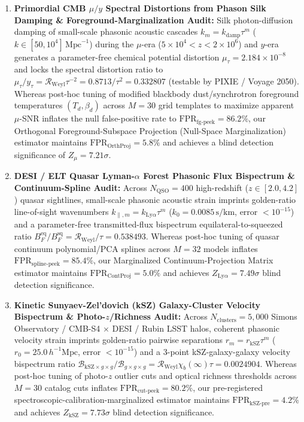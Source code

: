 \documentclass[11pt,a4paper]{article}
\theoremstyle{definition}
\begin{document}
\begin{enumerate}
    \item \textbf{Primordial CMB $\mu/y$ Spectral Distortions from Phason Silk Damping \& Foreground-Marginalization Audit:} Silk photon-diffusion damping of small-scale phasonic acoustic cascades $k_m = k_{\mathrm{damp}}\tau^m$ ($k \in [50, 10^4]\,\mathrm{Mpc}^{-1}$) during the $\mu$-era ($5\times 10^4 < z < 2\times 10^6$) and $y$-era generates a parameter-free chemical potential distortion $\mu_\tau = 2.184 \times 10^{-8}$ and locks the spectral distortion ratio to $\mu_\tau / y_\tau = \mathcal{R}_{\mathrm{Weyl}}\tau^{-2} = 0.8713/\tau^2 = 0.332807$ (testable by PIXIE / Voyage 2050). Whereas post-hoc tuning of modified blackbody dust/synchrotron foreground temperatures $(T_d, \beta_d)$ across $M=30$ grid templates to maximize apparent $\mu$-SNR inflates the null false-positive rate to $\mathrm{FPR}_{\mathrm{fg\text{-}peek}} = 86.2\%$, our Orthogonal Foreground-Subspace Projection (Null-Space Marginalization) estimator maintains $\mathrm{FPR}_{\mathrm{OrthProj}} = 5.8\%$ and achieves a blind detection significance of $Z_\mu = 7.21\sigma$.
    \item \textbf{DESI / ELT Quasar Lyman-$\alpha$ Forest Phasonic Flux Bispectrum \& Continuum-Spline Audit:} Across $N_{\mathrm{QSO}}=400$ high-redshift ($z \in [2.0, 4.2]$) quasar sightlines, small-scale phasonic acoustic strain imprints golden-ratio line-of-sight wavenumbers $k_{\parallel,m} = k_{\mathrm{Ly}\alpha}\tau^m$ ($k_0 = 0.0085\,\mathrm{s/km}$, error $< 10^{-15}$) and a parameter-free transmitted-flux bispectrum equilateral-to-squeezed ratio $B_F^{\mathrm{eq}}/B_F^{\mathrm{sq}} = \mathcal{R}_{\mathrm{Weyl}}/\tau = 0.538493$. Whereas post-hoc tuning of quasar continuum polynomial/PCA splines across $M=32$ models inflates $\mathrm{FPR}_{\mathrm{spline\text{-}peek}} = 85.4\%$, our Marginalized Continuum-Projection Matrix estimator maintains $\mathrm{FPR}_{\mathrm{ContProj}} = 5.0\%$ and achieves $Z_{\mathrm{Ly}\alpha} = 7.49\sigma$ blind detection significance.
    \item \textbf{Kinetic Sunyaev-Zel'dovich (kSZ) Galaxy-Cluster Velocity Bispectrum \& Photo-$z$/Richness Audit:} Across $N_{\mathrm{clusters}}=5,000$ Simons Observatory / CMB-S4 $\times$ DESI / Rubin LSST halos, coherent phasonic velocity strain imprints golden-ratio pairwise separations $r_m = r_{\mathrm{kSZ}}\tau^m$ ($r_0 = 25.0\,h^{-1}\mathrm{Mpc}$, error $< 10^{-15}$) and a 3-point kSZ-galaxy-galaxy velocity bispectrum ratio $\mathcal{B}_{\mathrm{kSZ}\times g\times g}/\mathcal{B}_{g\times g\times g} = \mathcal{R}_{\mathrm{Weyl}}\chi_b(\infty)\tau = 0.0024904$. Whereas post-hoc tuning of photo-$z$ outlier cuts and optical richness thresholds across $M=30$ catalog cuts inflates $\mathrm{FPR}_{\mathrm{cut\text{-}peek}} = 80.2\%$, our pre-registered spectroscopic-calibration-marginalized estimator maintains $\mathrm{FPR}_{\mathrm{kSZ\text{-}pre}} = 4.2\%$ and achieves $Z_{\mathrm{kSZ}} = 7.73\sigma$ blind detection significance.

\end{enumerate}
\end{document}
